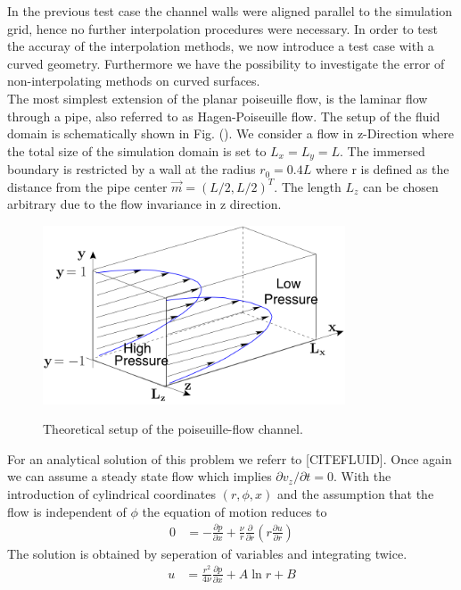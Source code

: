 In the previous test case the channel walls were aligned parallel to the simulation grid, hence no further interpolation procedures
were necessary. In order to test the accuray of the interpolation methods, we now introduce a test case with a curved geometry.
Furthermore we have the possibility to investigate the error of non-interpolating methods on curved surfaces.\\
The most simplest extension of the planar poiseuille flow, is the laminar flow through a pipe,
also referred to as Hagen-Poiseuille flow. The setup of the fluid domain is schematically shown in Fig. ().
We consider a flow in z-Direction where the total size of the simulation domain is set to $L_x = L_y = L$.
The immersed boundary is restricted by a wall at the radius $r_0=0.4L$ where r is defined as the distance from the pipe center $\vec{m} = (L/2, L/2)^T$.
The length $L_z$ can be chosen arbitrary due to the flow invariance in z direction.\\
\begin{figure}[!bp]
  \centering
  \includegraphics[width=0.8\textwidth]{gfx/immersed_boundary/val_volpen/poiseuilleflow.png}\label{b}
  \caption{Theoretical setup of the poiseuille-flow channel.}
\end{figure}
For an analytical solution of this problem we referr to [CITEFLUID].
Once again we can assume a steady state flow which implies $\partial v_z/\partial t = 0$. With the introduction of cylindrical coordinates $(r, \phi, x)$
and the assumption that the flow is independent of $\phi$ the equation of motion reduces to
\begin{align}
        0 &= - \frac{\partial p}{\partial x}  +  \frac{\nu}{r}\frac{\partial}{\partial r}\left(r\frac{\partial u}{\partial r}\right)
\end{align}
The solution is obtained by seperation of variables and integrating twice.
\begin{align}
    u &= \frac{r^2}{4\nu}\frac{\partial p}{\partial x} + A \ln r + B
\end{align}
